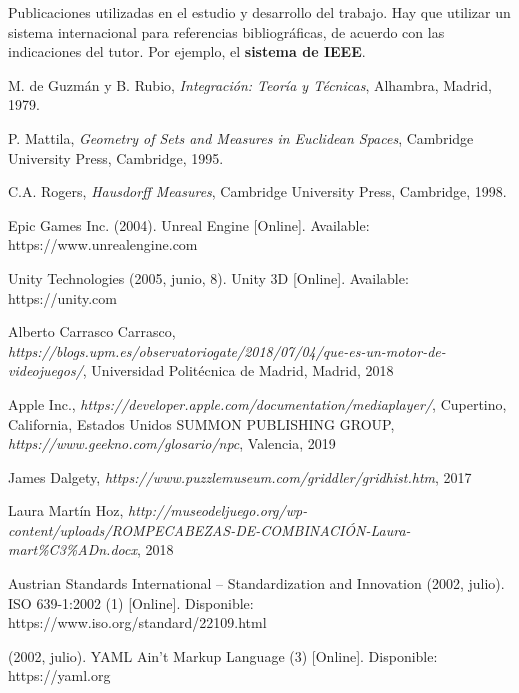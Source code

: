 \begin{thebibliography}{99}
 Publicaciones utilizadas en el estudio y desarrollo del trabajo.
Hay que utilizar un sistema internacional para referencias bibliográficas, de acuerdo con las indicaciones del tutor. Por ejemplo, el \textbf{sistema de IEEE}.

 M. de Guzmán y B. Rubio, \textit{Integración: Teoría y Técnicas}, Alhambra, Madrid, 1979.

 P. Mattila, \textit{Geometry of Sets and Measures in Euclidean Spaces}, Cambridge University Press, Cambridge, 1995.

 C.A. Rogers, \textit{Hausdorff Measures}, Cambridge University Press, Cambridge, 1998.

 Epic Games Inc. (2004). Unreal Engine [Online]. Available: https://www.unrealengine.com

 Unity Technologies (2005, junio, 8). Unity 3D [Online]. Available: https://unity.com

 Alberto Carrasco Carrasco, \textit{https://blogs.upm.es/observatoriogate/2018/07/04/que-es-un-motor-de-videojuegos/}, Universidad Politécnica de Madrid, Madrid, 2018

 Apple Inc., \textit{https://developer.apple.com/documentation/mediaplayer/}, Cupertino, California, Estados Unidos
 SUMMON PUBLISHING GROUP, \textit{https://www.geekno.com/glosario/npc}, Valencia, 2019

 James Dalgety, \textit{https://www.puzzlemuseum.com/griddler/gridhist.htm}, 2017

 Laura Martín Hoz, \textit{http://museodeljuego.org/wp-content/uploads/ROMPECABEZAS-DE-COMBINACIÓN-Laura-mart\%C3\%ADn.docx}, 2018

 Austrian Standards International – Standardization and Innovation (2002, julio). ISO 639-1:2002 (1) [Online]. Disponible: https://www.iso.org/standard/22109.html

 (2002, julio). YAML Ain’t Markup Language (3) [Online]. Disponible: https://yaml.org

\end{thebibliography}
